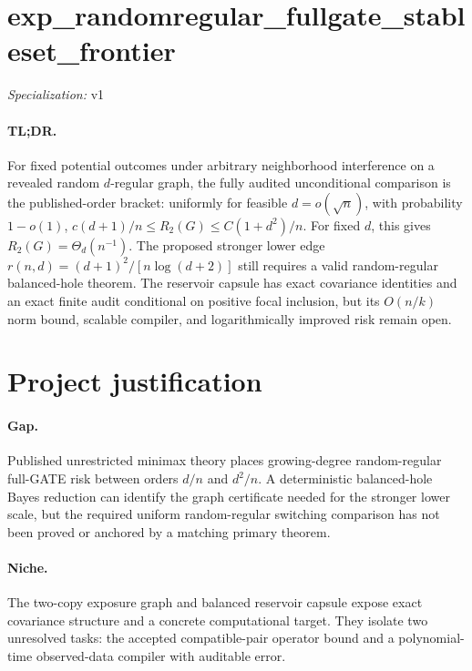 \documentclass{article}
\begin{document}
\sloppy

\section*{exp\_\allowbreak{}randomregular\_\allowbreak{}fullgate\_\allowbreak{}stableset\_\allowbreak{}frontier}

\noindent\textit{Specialization:} v1\par

\paragraph{TL;DR.} For fixed potential outcomes under arbitrary neighborhood interference on a revealed random \(d\)-regular graph, the fully audited unconditional comparison is the published-order bracket: uniformly for feasible \(d=o(\sqrt n)\), with probability \(1-o(1)\), \(c(d+1)/n\le R_2(G)\le C(1+d^2)/n\). For fixed \(d\), this gives \(R_2(G)=\Theta_d(n^{-1})\). The proposed stronger lower edge \(r(n,d)=(d+1)^2/[n\log(d+2)]\) still requires a valid random-regular balanced-hole theorem. The reservoir capsule has exact covariance identities and an exact finite audit conditional on positive focal inclusion, but its \(O(n/k)\) norm bound, scalable compiler, and logarithmically improved risk remain open.

\section{Project justification}

\paragraph{Gap.} Published unrestricted minimax theory places growing-degree random-regular full-GATE risk between orders \(d/n\) and \(d^2/n\). A deterministic balanced-hole Bayes reduction can identify the graph certificate needed for the stronger lower scale, but the required uniform random-regular switching comparison has not been proved or anchored by a matching primary theorem.

\paragraph{Niche.} The two-copy exposure graph and balanced reservoir capsule expose exact covariance structure and a concrete computational target. They isolate two unresolved tasks: the accepted compatible-pair operator bound and a polynomial-time observed-data compiler with auditable error.
\end{document}
